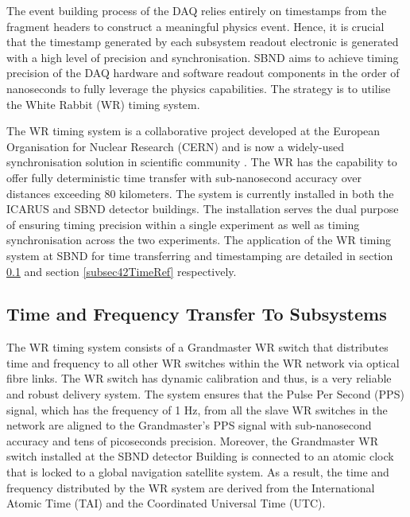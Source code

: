 The event building process of the DAQ relies entirely on timestamps from the fragment headers to construct a meaningful physics event.
Hence, it is crucial that the timestamp generated by each subsystem readout electronic is generated with a high level of precision and synchronisation.
SBND aims to achieve timing precision of the DAQ hardware and software readout components in the order of nanoseconds to fully leverage the physics capabilities.
The strategy is to utilise the White Rabbit (WR) timing system.

The WR timing system is a collaborative project developed at the European Organisation for Nuclear Research (CERN) and is now a widely-used synchronisation solution in scientific community \cite{WR_paper}.
The WR has the capability to offer fully deterministic time transfer with sub-nanosecond accuracy over distances exceeding 80 kilometers.
The system is currently installed in both the ICARUS and SBND detector buildings.
The installation serves the dual purpose of ensuring timing precision within a single experiment as well as timing synchronisation across the two experiments. 
The application of the WR timing system at SBND for time transferring and timestamping are detailed in section \ref{subsec41TimeRef} and section \ref{subsec42TimeRef} respectively.

\subsection{Time and Frequency Transfer To Subsystems}
\label{subsec41TimeRef}

The WR timing system consists of a Grandmaster WR switch that distributes time and frequency to all other WR switches within the WR network via optical fibre links.
The WR switch has dynamic calibration and thus, is a very reliable and robust delivery system.
The system ensures that the Pulse Per Second (PPS) signal, which has the frequency of 1 Hz, from all the slave WR switches in the network are aligned to the Grandmaster's PPS signal with sub-nanosecond accuracy and tens of picoseconds precision. 
Moreover, the Grandmaster WR switch installed at the SBND detector Building is connected to an atomic clock that is locked to a global navigation satellite system. 
As a result, the time and frequency distributed by the WR system are derived from the International Atomic Time (TAI) and the Coordinated Universal Time (UTC).

